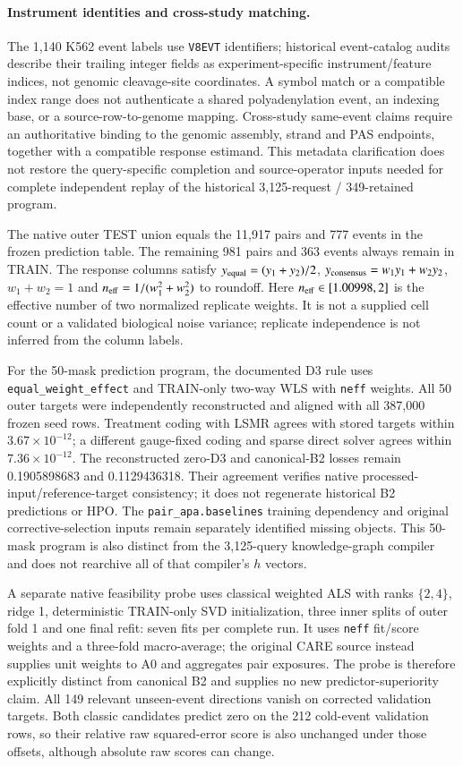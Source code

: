 \documentclass[11pt]{article}
\begin{document}
\paragraph{Instrument identities and cross-study matching.}
The 1,140 K562 event labels use \texttt{V8EVT} identifiers; historical event-catalog audits describe their trailing integer fields as experiment-specific instrument/feature indices, not genomic cleavage-site coordinates. A symbol match or a compatible index range does not authenticate a shared polyadenylation event, an indexing base, or a source-row-to-genome mapping. Cross-study same-event claims require an authoritative binding to the genomic assembly, strand and PAS endpoints, together with a compatible response estimand. This metadata clarification does not restore the query-specific completion and source-operator inputs needed for complete independent replay of the historical 3,125-request / 349-retained program.


The native outer TEST union equals the 11,917 pairs and 777 events in the frozen prediction table. The remaining 981 pairs and 363 events always remain in TRAIN. The response columns satisfy $y_{\rm equal}=(y_1+y_2)/2$, $y_{\rm consensus}=w_1y_1+w_2y_2$, $w_1+w_2=1$ and $n_{\rm eff}=1/(w_1^2+w_2^2)$ to roundoff. Here $n_{\rm eff}\in[1.00998,2]$ is the effective number of two normalized replicate weights. It is not a supplied cell count or a validated biological noise variance; replicate independence is not inferred from the column labels.

For the 50-mask prediction program, the documented D3 rule uses \texttt{equal\_weight\_effect} and TRAIN-only two-way WLS with \texttt{neff} weights. All 50 outer targets were independently reconstructed and aligned with all 387,000 frozen seed rows. Treatment coding with LSMR agrees with stored targets within $3.67\times10^{-12}$; a different gauge-fixed coding and sparse direct solver agrees within $7.36\times10^{-12}$. The reconstructed zero-D3 and canonical-B2 losses remain 0.1905898683 and 0.1129436318. Their agreement verifies native processed-input/reference-target consistency; it does not regenerate historical B2 predictions or HPO. The \texttt{pair\_apa.baselines} training dependency and original corrective-selection inputs remain separately identified missing objects. This 50-mask program is also distinct from the 3,125-query knowledge-graph compiler and does not rearchive all of that compiler's $h$ vectors.

A separate native feasibility probe uses classical weighted ALS with ranks $\{2,4\}$, ridge 1, deterministic TRAIN-only SVD initialization, three inner splits of outer fold 1 and one final refit: seven fits per complete run. It uses \texttt{neff} fit/score weights and a three-fold macro-average; the original CARE source instead supplies unit weights to A0 and aggregates pair exposures. The probe is therefore explicitly distinct from canonical B2 and supplies no new predictor-superiority claim. All 149 relevant unseen-event directions vanish on corrected validation targets. Both classic candidates predict zero on the 212 cold-event validation rows, so their relative raw squared-error score is also unchanged under those offsets, although absolute raw scores can change.
\end{document}
